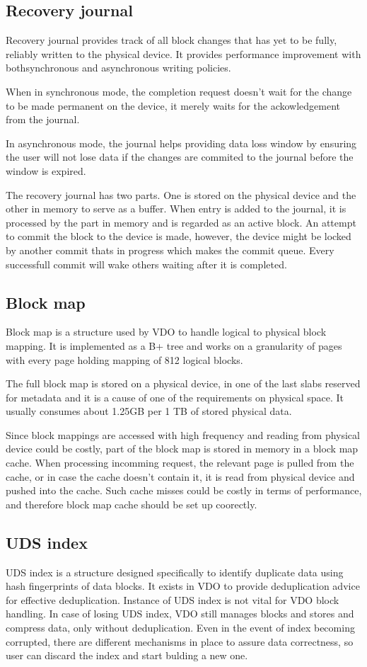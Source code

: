 \documentclass[
  color, %
  table, %
  lof,   %
  lot,   %
]{fithesis3}
\begin{document}
\subsection{Recovery journal}
Recovery journal provides track of all block changes that has yet to be fully, reliably written to the physical device. It provides performance improvement with bothsynchronous and asynchronous writing policies.

When in synchronous mode, the completion request doesn't wait for the change to be made permanent on the device, it merely waits for the ackowledgement from the journal.

In asynchronous mode, the journal helps providing data loss window by ensuring the user will not lose data if the changes are commited to the journal before the window is expired.

The recovery journal has two parts. One is stored on the physical device and the other in memory to serve as a buffer. When entry is added to the journal, it is processed by the part in memory and is regarded as an active block. An attempt to commit the block to the device is made, however, the device might be locked by another commit thats in progress which makes the commit queue. Every successfull commit will wake others waiting after it is completed.


\subsection{Block map}
Block map is a structure used by VDO to handle logical to physical block mapping. It is implemented as a B+ tree and works on a granularity of pages with every page holding mapping of 812 logical blocks.

The full block map is stored on a physical device, in one of the last slabs reserved for metadata and it is a cause of one of the requirements on physical space. It usually consumes about 1.25GB per 1 TB of stored physical data.

Since block mappings are accessed with high frequency and reading from physical device could be costly, part of the block map is stored in memory in a block map cache. When processing incomming request, the relevant page is pulled from the cache, or in case the cache doesn't contain it, it is read from physical device and pushed into the cache. Such cache misses could be costly in terms of performance, and therefore block map cache should be set up coorectly.

\subsection{UDS index}
UDS index is a structure designed specifically to identify duplicate data using hash fingerprints of data blocks. It exists in VDO to provide deduplication advice for effective deduplication. Instance of UDS index is not vital for VDO block handling. In case of losing UDS index, VDO still manages blocks and stores and compress data, only without deduplication. Even in the event of index becoming corrupted, there are different mechanisms in place to assure data correctness, so user can discard the index and start bulding a new one.
\end{document}
